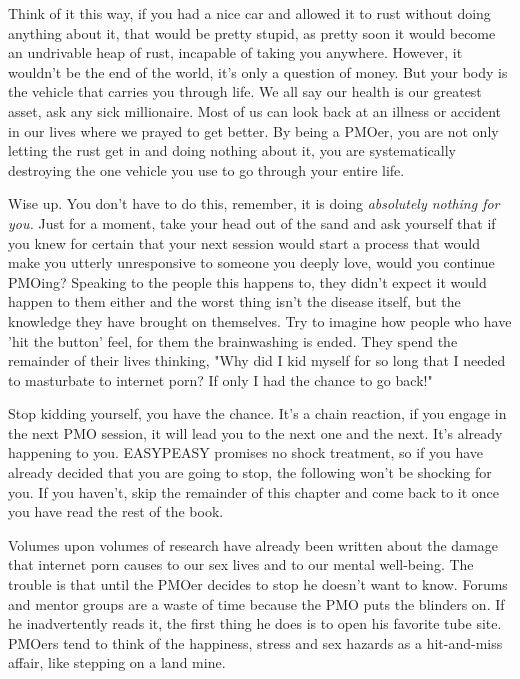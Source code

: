 \documentclass[easypeasy.tex]{subfiles}
\begin{document}
Think of it this way, if you had a nice car and allowed it to rust without doing anything about it, that would be pretty stupid, as pretty soon it would become an undrivable heap of rust, incapable of taking you anywhere. However, it wouldn't be the end of the world, it's only a question of money. But your body is the vehicle that carries you through life. We all say our health is our greatest asset, ask any sick millionaire. Most of us can look back at an illness or accident in our lives where we prayed to get better. By being a PMOer, you are not only letting the rust get in and doing nothing about it, you are systematically destroying the one vehicle you use to go through your entire life.

Wise up. You don't have to do this, remember, it is doing \textit{absolutely nothing for you.} Just for a moment, take your head out of the sand and ask yourself that if you knew for certain that your next session would start a process that would make you utterly unresponsive to someone you deeply love, would you continue PMOing? Speaking to the people this happens to, they didn't expect it would happen to them either and the worst thing isn't the disease itself, but the knowledge they have brought on themselves. Try to imagine how people who have 'hit the button' feel, for them the brainwashing is ended. They spend the remainder of their lives thinking, "Why did I kid myself for so long that I needed to masturbate to internet porn? If only I had the chance to go back!"

Stop kidding yourself, you have the chance. It's a chain reaction, if you engage in the next PMO session, it will lead you to the next one and the next. It's already happening to you. EASYPEASY promises no shock treatment, so if you have already decided that you are going to stop, the following won't be shocking for you. If you haven't, skip the remainder of this chapter and come back to it once you have read the rest of the book.

Volumes upon volumes of research have already been written about the damage that internet porn causes to our sex lives and to our mental well-being. The trouble is that until the PMOer decides to stop he doesn't want to know. Forums and mentor groups are a waste of time because the PMO puts the blinders on. If he inadvertently reads it, the first thing he does is to open his favorite tube site. PMOers tend to think of the happiness, stress and sex hazards as a hit-and-miss affair, like stepping on a land mine.
\end{document}
